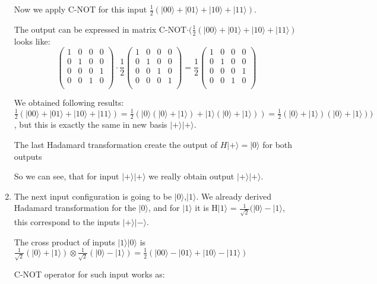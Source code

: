 \documentclass[a4paper,10pt]{article}
\newcommand{\qb}[1]{\ensuremath{\vert{#1}\rangle}}
\newcommand{\asp}{\ensuremath{\frac{1}{\sqrt{2}}}}
\newcommand{\ap}{\ensuremath{\frac{1}{2}}}
\begin{document}
\begin{enumerate}
Now we apply C-NOT for this input $\ap (\qb{00} + \qb{01} + \qb{10} + \qb{11})$.

The output can be expressed in matrix C-NOT$\cdot(\ap (\qb{00} + \qb{01} + \qb{10} + \qb{11})$ looks like:
$$
\left( \begin{array}{cccc}
1 & 0 & 0 & 0 \\
0 & 1 & 0 & 0 \\
0 & 0 & 0 & 1 \\
0 & 0 & 1 & 0 \\
\end{array} \right)
\cdot \ap
\left( \begin{array}{cccc}
1 & 0 & 0 & 0 \\
0 & 1 & 0 & 0 \\
0 & 0 & 1 & 0 \\
0 & 0 & 0 & 1 \\
\end{array} \right)
=
\ap
\left( \begin{array}{cccc}
1 & 0 & 0 & 0 \\
0 & 1 & 0 & 0 \\
0 & 0 & 0 & 1 \\
0 & 0 & 1 & 0 \\
\end{array} \right)
$$

We obtained following results: $\ap (\qb{00} + \qb{01} + \qb{10} + \qb{11}) = \ap (\qb{0}(\qb{0} + \qb{1}) + \qb{1}(\qb{0} + \qb{1})) = \ap (\qb{0}+\qb{1})(\qb{0} + \qb{1}))$, but this is exactly the same in new basis \qb{+}\qb{+}.

The last Hadamard transformation create the output of $H \qb{+} = \qb{0}$ for both outputs

So we can see, that for input \qb{+}\qb{+} we really obtain output \qb{+}\qb{+}.

\item The next input configuration is going to be \qb{0},\qb{1}. We already derived Hadamard transformation for the \qb{0}, and for \qb{1} it is H\qb{1} = $\asp (\qb{0} - \qb{1}$, this correspond to the inputs \qb{+}\qb{-}.	

The cross product of inputs \qb{1}\qb{0} is $\asp (\qb{0}+\qb{1})\otimes \asp (\qb{0}-\qb{1})= \ap (\qb{00} - \qb{01} + \qb{10} - \qb{11})$ 

C-NOT operator for such input works as:


\end{enumerate}
\end{document}
